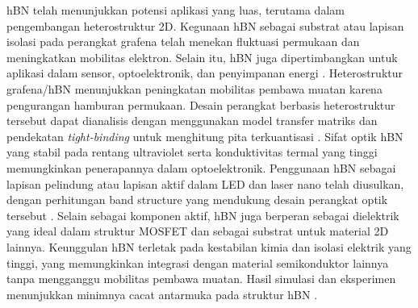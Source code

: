 hBN telah menunjukkan potensi aplikasi yang luas, terutama dalam pengembangan heterostruktur 2D. Kegunaan hBN sebagai substrat atau lapisan isolasi pada perangkat grafena telah menekan fluktuasi permukaan dan meningkatkan mobilitas elektron. Selain itu, hBN juga dipertimbangkan untuk aplikasi dalam sensor, optoelektronik, dan penyimpanan energi \citep{Wang2017}. Heterostruktur grafena/hBN menunjukkan peningkatan mobilitas pembawa muatan karena pengurangan hamburan permukaan. Desain perangkat berbasis heterostruktur tersebut dapat dianalisis dengan menggunakan model transfer matriks dan pendekatan \emph{tight-binding} untuk menghitung pita terkuantisasi \citep{CastroNeto2009}. Sifat optik hBN yang stabil pada rentang ultraviolet serta konduktivitas termal yang tinggi memungkinkan penerapannya dalam optoelektronik. Penggunaan hBN sebagai lapisan pelindung atau lapisan aktif dalam LED dan laser nano telah diusulkan, dengan perhitungan band structure yang mendukung desain perangkat optik tersebut \citep{Zhang2020}. Selain sebagai komponen aktif, hBN juga berperan sebagai dielektrik yang ideal dalam struktur MOSFET dan sebagai substrat untuk material 2D lainnya. Keunggulan hBN terletak pada kestabilan kimia dan isolasi elektrik yang tinggi, yang memungkinkan integrasi dengan material semikonduktor lainnya tanpa mengganggu mobilitas pembawa muatan. Hasil simulasi dan eksperimen menunjukkan minimnya cacat antarmuka pada struktur hBN \citep{Bhimanapati2016}. %
